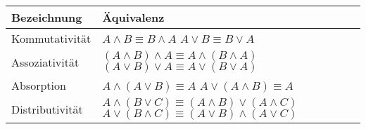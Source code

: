 \documentclass{article}
\begin{document}
\begin{adjustbox}{center}
	\setlength{\extrarowheight}{10pt}
	\begin{tabular}{L{4cm}|C{6cm}}
		Bezeichnung     & Äquivalenz                                                         \\
		[10pt]\midrule
		Kommutativität  &  \\
		[10pt]
		Assoziativität  &  \\
		[10pt]
		Absorption      &  \\
		[10pt]
		Distributivität &  \\
	\end{tabular}
\end{adjustbox}
\end{document}

